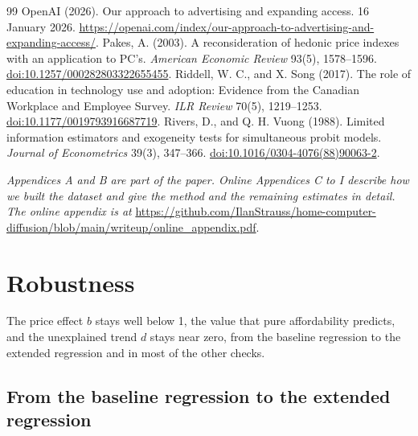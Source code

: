\documentclass[11pt]{article}
\begin{document}
\begin{thebibliography}{99}
 OpenAI (2026). Our approach to advertising and expanding access. 16 January 2026. \url{https://openai.com/index/our-approach-to-advertising-and-expanding-access/}.
 Pakes, A. (2003). A reconsideration of hedonic price indexes with an application to PC's. \emph{American Economic Review} 93(5), 1578--1596. \href{https://doi.org/10.1257/000282803322655455}{doi:10.1257/000282803322655455}.
 Riddell, W. C., and X. Song (2017). The role of education in technology use and adoption: Evidence from the Canadian Workplace and Employee Survey. \emph{ILR Review} 70(5), 1219--1253. \href{https://doi.org/10.1177/0019793916687719}{doi:10.1177/0019793916687719}.
 Rivers, D., and Q. H. Vuong (1988). Limited information estimators and exogeneity tests for simultaneous probit models. \emph{Journal of Econometrics} 39(3), 347--366. \href{https://doi.org/10.1016/0304-4076(88)90063-2}{doi:10.1016/0304-4076(88)90063-2}.
\end{thebibliography}
\endgroup

\clearpage
\appendix
{}
\renewcommand{\thefigure}{\thesection\arabic{figure}}
\renewcommand{\thetable}{\thesection\arabic{table}}

\noindent\emph{Appendices A and B are part of the paper. Online Appendices C to I describe how we built the dataset and give the method and the remaining estimates in detail. The online appendix is at} \url{https://github.com/IlanStrauss/home-computer-diffusion/blob/main/writeup/online_appendix.pdf}.

\section{Robustness}
\label{sec:checks}

The price effect $b$ stays well below 1, the value that pure affordability predicts, and the unexplained trend $d$ stays near zero, from the baseline regression to the extended regression and in most of the other checks.

\subsection{From the baseline regression to the extended regression}
\label{app:steps}
\end{document}
